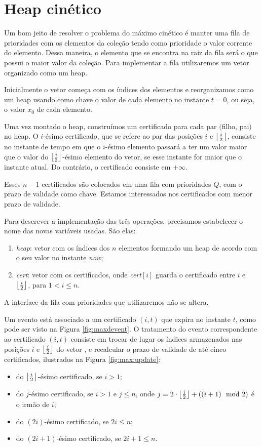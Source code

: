 
\section{Heap cinético}
\label{heap:secao}
Um bom jeito de resolver o problema do máximo cinético é manter uma
fila de prioridades com os elementos da coleção tendo como
prioridade o valor corrente do elemento. Dessa maneira, o elemento
que se encontra na raiz da fila será o que possui o maior valor da
coleção. Para implementar a fila utilizaremos um vetor organizado
como um heap.

Inicialmente o vetor começa com os índices dos elementos e
reorganizamos como um heap usando como chave o valor de cada
elemento no instante $t = 0$, ou seja, o valor $x_0$ de cada
elemento.

Uma vez montado o heap, construímos um certificado para cada par
$($filho, pai$)$ no heap. O $i$-ésimo certificado, que se refere ao
par das posições $i$ e $\left\lfloor \frac{i}{2} \right\rfloor$, consiste no instante
de tempo em que o $i$-ésimo elemento passará a ter um valor maior
que o valor do $\left\lfloor \frac{i}{2} \right\rfloor$-ésimo elemento do vetor, se
esse instante for maior que o instante atual. Do contrário, o
certificado consiste em $+\infty$.

Esses $n - 1$ certificados são colocados em uma fila com prioridades
$Q$, com o prazo de validade como chave. Estamos interessados nos
certificados com menor prazo de validade.

Para descrever a implementação das três operações, precisamos
estabelecer o nome das novas variáveis usadas. São elas:
\begin{enumerate}
    \item \textit{heap}: vetor com os índices dos $n$ elementos
    formando um heap de acordo com o seu valor no instante
    \textit{now};
    \item \textit{cert}: vetor com os certificados, onde
    \textit{cert}$[i]$ guarda o certificado entre $i$ e
    $\left\lfloor \frac{i}{2} \right\rfloor$, para $1 < i \leq n$.
\end{enumerate}

A interface da fila com prioridades que utilizaremos não se altera.

Um evento está associado a um certificado $(i, t)$ que expira no
instante $t$, como pode ser visto na Figura \ref{fig:maxdevent}. O
tratamento do evento correspondente ao certificado $(i, t)$ consiste
em trocar de lugar os índices armazenados nas posições $i$ e
$\left\lfloor \frac{i}{2} \right\rfloor$ do vetor \heap, e recalcular o prazo de
validade de até cinco certificados, ilustrados na Figura
\ref{fig:max:update}:
\begin{itemize}
    \item do $\left\lfloor \frac{i}{2} \right\rfloor$-ésimo certificado, se $i > 1$;
    \item do $j$-ésimo certificado, se $i > 1$ e $j \leq n$,
    onde $j = 2\cdot \left\lfloor \frac{i}{2} \right\rfloor + ((i + 1)\mod2)$
    é o irmão de $i$;
    \item do $(2i)$-ésimo certificado, se $2i \leq n$;
    \item do $(2i + 1)$-ésimo certificado, se $2i + 1 \leq n$.
\end{itemize}

